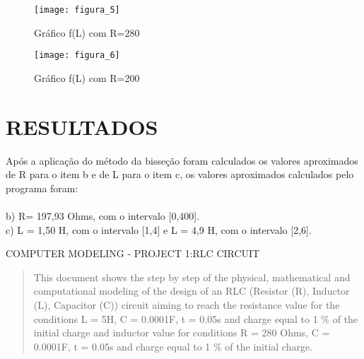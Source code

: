 \documentclass[12pt,fleqn]{article}
\begin{document}
\begin{figure}[H] %
\vspace{-2pt}
\begin{center}
\texttt{[image: figura\_5]}%
\caption{Gráfico f(L) com R=280}
\label{fig5}%
\end{center}
\end{figure}

\begin{figure}[H] %
\vspace{-2pt}
\begin{center}
\texttt{[image: figura\_6]}%
\caption{Gráfico f(L) com R=200}
\label{fig6}%
\end{center}
\end{figure}

\section{RESULTADOS}
Após a aplicação do método da bisseção foram calculados os valores aproximados de R para o item b e de L para o item c, os valores aproximados calculados pelo programa foram:\\ \\
b) R= 197,93 Ohms, com o intervalo [0,400].\\
c) L = 1,50 H, com o intervalo [1,4] e L = 4,9 H, com o intervalo [2,6].

\newpage


\vspace*{-0.1cm}


\begin{center}
\vspace{1cm}
  COMPUTER MODELING - PROJECT 1:RLC CIRCUIT
\end{center}

\def\abstractname{Abstract}%

\begin{abstract}
This document shows the step by step of the physical, mathematical and computational modeling of the design of an RLC (Resistor (R), Inductor (L), Capacitor (C)) circuit aiming to reach the resistance value for the conditions L = 5H, C = 0.0001F, t = 0.05s and charge equal to 1 \% of the initial charge and inductor value for conditions R = 280 Ohms, C = 0.0001F, t = 0.05s and charge equal to 1 \% of the initial charge.
\end{abstract}

\end{document}
